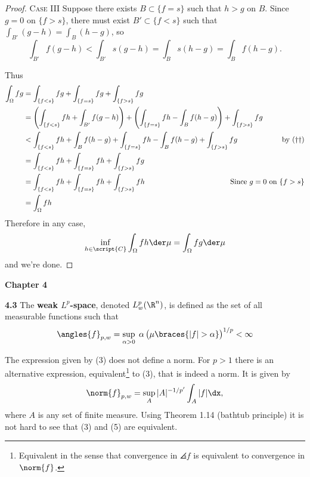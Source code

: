 \documentclass[12pt,letterpaper]{article}
\begin{document}
\begin{enumerate}
\begin{proof}
	\textsc{Case III} Suppose there exists $B\subset \{f=s\}$ such that $h>g$ on $B$. Since $g=0$ on $\{f>s\}$, there must exist $B'\subset \{f<s\}$ such that $\int_{B'} (g-h)=\int_{B} (h-g)$, so 
	\begin{equation}
	\int_{B'} f(g-h) < \int_{B'} s  (g-h) = \int_{B} s(h-g) = \int_{B} f(h-g).\tag{$\dagger\dagger$}
	\end{equation}
	
	Thus 
	\begin{align*}
	\int_\Omega fg &= \int_{\{f<s\}} fg + \int_{\{f= s\}} fg + \int_{\{f> s\}} fg\\
	&= \left( \int_{\{f<s\}} fh + \int_{B'} f(g-h) \right) + \left( \int_{\{f=s\}} fh - \int_{B} f(h-g) \right) + \int_{\{f>s\}} fg\\ 
	&< \int_{\{f<s\}} fh + \int_{B} f(h-g) + \int_{\{f=s\}} fh - \int_{B} f(h-g)  + \int_{\{f>s\}} fg & \text{by }(\dagger\dagger)\\ 
	&= \int_{\{f<s\}} fh  + \int_{\{f=s\}} fh  + \int_{\{f>s\}} fg \\
	&= \int_{\{f<s\}} fh  + \int_{\{f=s\}} fh  + \int_{\{f>s\}} fh &\hspace*{-.75in} \text{Since }g=0\text{ on } \{f>s\}\\
	&= \int_\Omega fh
	\end{align*}
	Therefore in any case, 
	\setcounter{equation}{0}
	\begin{equation}
	\inf_{h\in\script{C}} \int_\Omega fh\der\mu=\int_\Omega fg\der\mu
	\end{equation}	
	and we're done. 
	\end{proof}
	
	

\end{enumerate}

\pagebreak
\textbf{Chapter 4}

\textbf{4.3}
The \textbf{weak $L^p$-space}, denoted $L^p_w(\R^n)$, is defined as the set of all measurable functions such that
\setcounter{equation}{2}
\begin{equation}
\angles{f}_{p,w}=\sup_{\alpha>0}\;\alpha\,\big(\mu\braces{|f|>\alpha}\big)^{1/p}<\infty
\end{equation}

The expression given by (3) does not define a norm. For $p > 1$ there is an
alternative expression, equivalent\footnote{Equivalent in the sense that convergence in $\angles{f}$ is equivalent to convergence in $\norm{f}$.} to (3), that is indeed a norm. It is given
by
\setcounter{equation}{4}
\begin{equation}
\norm{f}_{p,w}=\sup_A |A|^{-1/p'} \int_A |f| \dx,
\end{equation}
where $A$ is any set of finite measure. Using Theorem 1.14 (bathtub principle) it is not hard to see that
(3) and (5) are equivalent.
\end{document}
